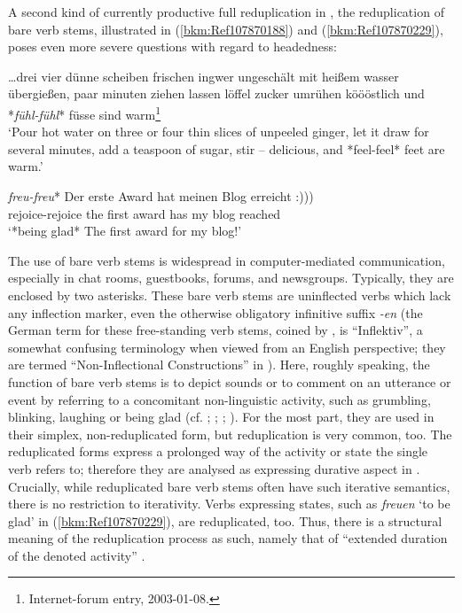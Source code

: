 \documentclass[output=paper
  ,nobabel
  ,draftmode
  ,colorlinks, citecolor=brown
]{langscibook}
\begin{document}
A second kind of currently productive full reduplication in , the reduplication of bare verb
stems, illustrated in (\ref{bkm:Ref107870188}) and (\ref{bkm:Ref107870229}), poses even more severe
questions with regard to headedness:

\ea
\label{bkm:Ref107870188}%
\ldots drei vier dünne scheiben frischen ingwer ungeschält mit heißem wasser übergießen, paar minuten ziehen lassen löffel zucker umrühen köööstlich und *\emph{fühl-fühl}* füsse sind warm\footnote{Internet-forum entry, 2003-01-08.}\\
`Pour hot water on three or four thin slices of unpeeled ginger, let it draw for several minutes, add a teaspoon of sugar, stir – delicious, and *feel-feel* feet are warm.'
\z

\ea
\label{bkm:Ref107870229}%
\gll *\emph{freu-freu}*        Der erste Award hat  meinen Blog  erreicht :)))\footnotemark    \\
     \hphantom{*}rejoice-rejoice   the  first award   has  my       blog   reached\\
\glt `*being glad* The first award for my blog!'
\z

\noindent
The use of bare verb stems is widespread in computer-mediated communication, especially in chat
rooms, guestbooks, forums, and newsgroups. Typically, they are enclosed by two asterisks. These bare
verb stems are uninflected verbs which lack any inflection marker, even the otherwise obligatory
infinitive suffix \emph{{}-en} (the German term for these free-standing verb stems, coined by
\citet{Teuber1999}, is ``Inflektiv'', a somewhat confusing terminology when viewed from an English
perspective; they are termed ``Non-Inflectional Constructions'' in ). Here,
roughly speaking, the function of bare verb stems is to depict sounds or to comment on an utterance
or event by referring to a concomitant non-linguistic activity, such as grumbling, blinking,
laughing or being glad (cf. \citealt[22--25]{Teuber1999}; \citealt[193--206]{Schlobinski2001};
\citealt[116–121]{Pankow2003}; \citealt[76–82]{BueckingRau2013}). For the most part, they are used in
their simplex, non-reduplicated form, but reduplication is very common, too. The reduplicated forms
express a prolonged way of the activity or state the single verb refers to; therefore they are
analysed as expressing durative aspect in . Crucially, while reduplicated
bare verb stems often have such iterative semantics, there is no restriction to iterativity. Verbs
expressing states, such as \emph{freuen} `to be glad' in (\ref{bkm:Ref107870229}), are reduplicated,
too. Thus, there is a structural meaning of the reduplication process as such, namely that of
``extended duration of the denoted activity'' \citep[936]{Freywald2015}.
\end{document}
